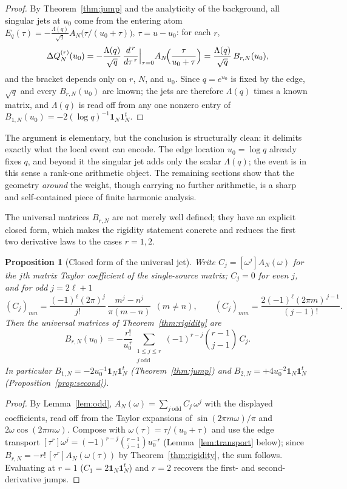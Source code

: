 \documentclass[11pt]{article}
\theoremstyle{plain}
\newtheorem{proposition}[theorem]{Proposition}
\theoremstyle{definition}
\theoremstyle{remark}
\newcommand{\one}{\mathbf 1}
\newcommand{\Lam}{\Lambda}
\begin{document}
\begin{proof}
By Theorem~\ref{thm:jump} and the analyticity of the background, all singular
jets at $u_0$ come from the entering atom
$E_q(\tau)=-\tfrac{\Lam(q)}{\sqrt q}A_N\!\bigl(\tau/(u_0+\tau)\bigr)$,
$\tau=u-u_0$: for each $r$,
\[
        \Delta Q_N^{(r)}(u_0)
        =-\frac{\Lam(q)}{\sqrt q}\,
        \frac{d^{\,r}}{d\tau^{\,r}}\Big|_{\tau=0}
        A_N\!\Bigl(\frac{\tau}{u_0+\tau}\Bigr)
        =\frac{\Lam(q)}{\sqrt q}\,B_{r,N}(u_0),
\]
and the bracket depends only on $r$, $N$, and $u_0$. Since $q=e^{u_0}$ is fixed
by the edge, $\sqrt q$ and every $B_{r,N}(u_0)$ are known; the jets are therefore
$\Lam(q)$ times a known matrix, and $\Lam(q)$ is read off from any one nonzero
entry of $B_{1,N}(u_0)=-2(\log q)^{-1}\one_N\one_N^t$.
\end{proof}

The argument is elementary, but the conclusion is structurally clean: it
delimits exactly what the local event can encode. The edge location $u_0=\log q$
already fixes $q$, and beyond it the singular jet adds only the scalar $\Lam(q)$;
the event is in this sense a rank-one arithmetic object. The remaining sections
show that the geometry \emph{around} the weight, though carrying no further
arithmetic, is a sharp and self-contained piece of finite harmonic analysis.

The universal matrices $B_{r,N}$ are not merely well defined; they have an
explicit closed form, which makes the rigidity statement concrete and reduces the
first two derivative laws to the cases $r=1,2$.

\begin{proposition}[Closed form of the universal jet]\label{prop:Bform}
Write $C_j=[\omega^j]A_N(\omega)$ for the $j$th matrix Taylor coefficient of the
single-source matrix; $C_j=0$ for even $j$, and for odd $j=2\ell+1$
\[
 (C_j)_{mn}=\frac{(-1)^\ell(2\pi)^j}{j!}\,\frac{m^j-n^j}{\pi(m-n)}\ \ (m\ne n),
 \qquad
 (C_j)_{mm}=\frac{2(-1)^\ell(2\pi m)^{\,j-1}}{(j-1)!}.
\]
Then the universal matrices of Theorem~\ref{thm:rigidity} are
\[
 B_{r,N}(u_0)=-\frac{r!}{u_0^{\,r}}
 \sum_{\substack{1\le j\le r\\ j\ \mathrm{odd}}}
 (-1)^{r-j}\binom{r-1}{j-1}\,C_j .
\]
In particular $B_{1,N}=-2u_0^{-1}\one_N\one_N^t$ (Theorem~\ref{thm:jump}) and
$B_{2,N}=+4u_0^{-2}\one_N\one_N^t$ (Proposition~\ref{prop:second}).
\end{proposition}

\begin{proof}
By Lemma~\ref{lem:odd}, $A_N(\omega)=\sum_{j\ \mathrm{odd}}C_j\,\omega^j$ with the
displayed coefficients, read off from the Taylor expansions of
$\sin(2\pi m\omega)/\pi$ and $2\omega\cos(2\pi m\omega)$. Compose with
$\omega(\tau)=\tau/(u_0+\tau)$ and use the edge transport
$[\tau^r]\omega^j=(-1)^{r-j}\binom{r-1}{j-1}u_0^{-r}$ (Lemma~\ref{lem:transport}
below); since $B_{r,N}=-r!\,[\tau^r]A_N(\omega(\tau))$ by
Theorem~\ref{thm:rigidity}, the sum follows. Evaluating at $r=1$ ($C_1=2\one_N\one_N^t$)
and $r=2$ recovers the first- and second-derivative jumps.
\end{proof}
\end{document}
